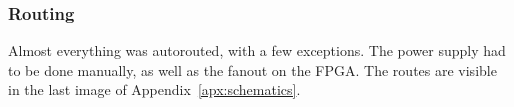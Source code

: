 
\subsubsection{Routing}

Almost everything was autorouted, with a few exceptions. The power supply had to be done manually, as well as the fanout on the FPGA. The routes are visible in the last image of Appendix~\ref{apx:schematics}.